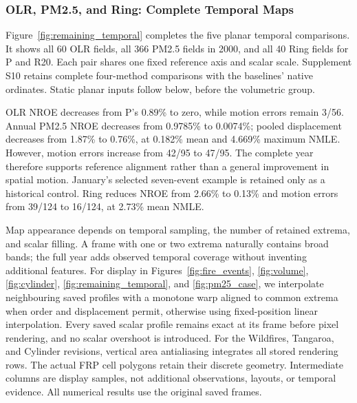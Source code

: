 \subsubsection{OLR, PM2.5, and Ring: Complete Temporal Maps}\label{sec:remaining_temporal}

Figure~\ref{fig:remaining_temporal} completes the five planar temporal comparisons. It shows all 60 OLR fields, all 366 PM2.5 fields in 2000, and all 40 Ring fields for P and R20. Each pair shares one fixed reference axis and scalar scale. Supplement S10 retains complete four-method comparisons with the baselines' native ordinates. Static planar inputs follow below, before the volumetric group.

OLR NROE decreases from P's 0.89\% to zero, while motion errors remain 3/56. Annual PM2.5 NROE decreases from 0.9785\% to 0.0074\%; pooled displacement decreases from 1.87\% to 0.76\%, at 0.182\% mean and 4.669\% maximum NMLE. However, motion errors increase from 42/95 to 47/95. The complete year therefore supports reference alignment rather than a general improvement in spatial motion. January's selected seven-event example is retained only as a historical control. Ring reduces NROE from 2.66\% to 0.13\% and motion errors from 39/124 to 16/124, at 2.73\% mean NMLE.

Map appearance depends on temporal sampling, the number of retained extrema, and scalar filling. A frame with one or two extrema naturally contains broad bands; the full year adds observed temporal coverage without inventing additional features. For display in Figures~\ref{fig:fire_events}, \ref{fig:volume}, \ref{fig:cylinder}, \ref{fig:remaining_temporal}, and \ref{fig:pm25_case}, we interpolate neighbouring saved profiles with a monotone warp aligned to common extrema when order and displacement permit, otherwise using fixed-position linear interpolation. Every saved scalar profile remains exact at its frame before pixel rendering, and no scalar overshoot is introduced. For the Wildfires, Tangaroa, and Cylinder revisions, vertical area antialiasing integrates all stored rendering rows. The actual FRP cell polygons retain their discrete geometry. Intermediate columns are display samples, not additional observations, layouts, or temporal evidence. All numerical results use the original saved frames.
